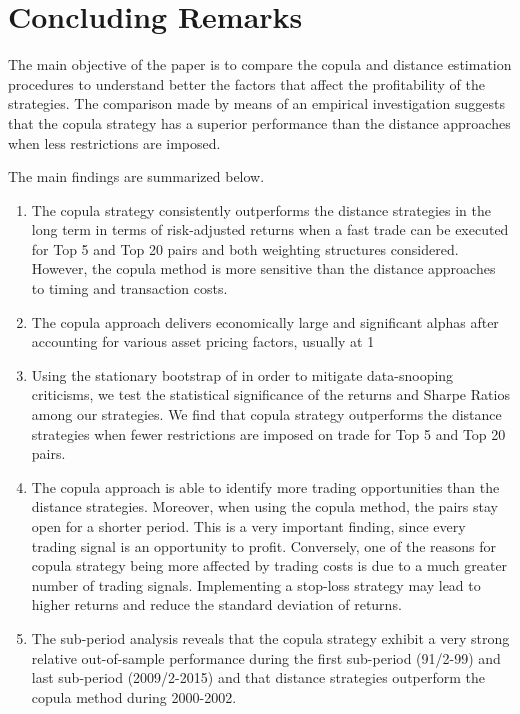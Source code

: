 \documentclass[a4paper]{article}
\begin{document}
	\section{Concluding Remarks}
	
The main objective of the paper is to compare the copula and distance estimation procedures to understand better the factors that affect the profitability of the strategies. The comparison made by means of an empirical investigation suggests that the copula strategy has a superior performance than the distance approaches when less restrictions are imposed.
	
The main findings are summarized below.
	
	\begin{enumerate}
		\item The copula strategy consistently outperforms the distance strategies in the long term in terms of risk-adjusted returns when a fast trade can be executed for Top 5 and Top 20 pairs and both weighting structures considered. However, the copula method is more sensitive than the distance approaches to timing and transaction costs.
		\item The copula approach delivers economically large and significant alphas after accounting for various asset pricing factors, usually at 1\\%
		\item Using the stationary bootstrap of \citet*{pr94} in order to mitigate data-snooping criticisms, we test the statistical significance of the returns and Sharpe Ratios among our strategies. We find that copula strategy outperforms the distance strategies when fewer restrictions are imposed on trade for Top 5 and Top 20 pairs.
		\item The copula approach is able to identify more trading opportunities than the distance strategies. Moreover, when using the copula method, the pairs stay open for a shorter period. This is a very important finding, since every trading signal is an opportunity to profit. Conversely, one of the reasons for copula strategy being more affected by trading costs is due to a much greater number of trading signals. Implementing a stop-loss strategy may lead to higher returns and reduce the standard
		deviation of returns.
		\item The sub-period analysis reveals that the copula strategy exhibit a very strong relative out-of-sample performance during the first sub-period (91/2-99) and last sub-period (2009/2-2015) and that distance strategies outperform the copula method during 2000-2002.
		
	\end{enumerate}
	
\end{document}
